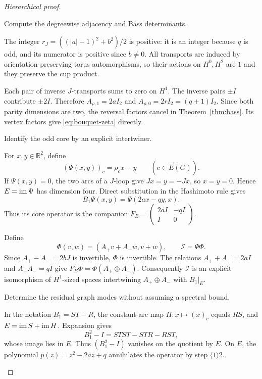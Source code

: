 \documentclass[11pt,a4paper]{article}
\theoremstyle{remark}\newtheorem{remark}[definition]{Remark}
\newcommand{\R}{\mathbb R}\newcommand{\C}{\mathbb C}\newcommand{\Z}{\mathbb Z}
\begin{document}
\begin{proof}[Hierarchical proof]
\begin{steps}
\item Compute the degreewise adjacency and Bass determinants.
\begin{steps}
\item The integer $r_J=((|a|-1)^2+b^2)/2$ is positive: it is an integer because $q$ is odd, and its numerator is positive since $b\ne0$. All transports are induced by orientation-preserving torus automorphisms, so their actions on $H^0,H^2$ are $1$ and they preserve the cup product.
\item Each pair of inverse $J$-transports sums to zero on $H^1$. The inverse pairs $\pm I$ contribute $\pm2I$. Therefore $A_{\rho,1}=2aI_2$ and $A_{\rho,0}=2rI_2=(q+1)I_2$. Since both parity dimensions are two, the reversal factors cancel in Theorem~\ref{thm:bass}. Its vertex factors give \eqref{eq:bouquet-zeta} directly.
\end{steps}
\item Identify the odd core by an explicit intertwiner.
\begin{steps}
\item For $x,y\in\R^2$, define
\[
(\Psi(x,y))_c=\rho_cx-y\qquad(c\in\vec E(G)).
\]
If $\Psi(x,y)=0$, the two arcs of a $J$-loop give $Jx=y=-Jx$, so $x=y=0$. Hence $E=\operatorname{im}\Psi$ has dimension four. Direct substitution in the Hashimoto rule gives
\[
B_1\Psi(x,y)=\Psi(2ax-qy,x).
\]
Thus its core operator is the companion $F_B=\left(\begin{smallmatrix}2aI&-qI\\I&0\end{smallmatrix}\right)$.
\item Define
\[
\Phi(v,w)=(A_+v+A_-w,v+w),\qquad \mathcal I=\Psi\Phi.
\tag{8.2}\label{eq:core-intertwiner}
\]
Since $A_+-A_-=2bJ$ is invertible, $\Phi$ is invertible. The relations $A_++A_-=2aI$ and $A_+A_-=qI$ give
$F_B\Phi=\Phi(A_+\oplus A_-)$.
Consequently $\mathcal I$ is an explicit isomorphism of $H^1$-sized spaces intertwining $A_+\oplus A_-$ with $B_1|_E$.
\end{steps}
\item Determine the residual graph modes without assuming a spectral bound.
\begin{steps}
\item In the notation $B_1=ST-R$, the constant-arc map $H:x\mapsto(x)_c$ equals $RS$, and $E=\operatorname{im} S+\operatorname{im} H$. Expansion gives
\[
B_1^2-I=STST-STR-RST,
\]
whose image lies in $E$. Thus $(B_1^2-I)$ vanishes on the quotient by $E$. On $E$, the polynomial $p(z)=z^2-2az+q$ annihilates the operator by step $\langle1\rangle2$.

\end{steps}
\end{steps}
\end{proof}
\end{document}
